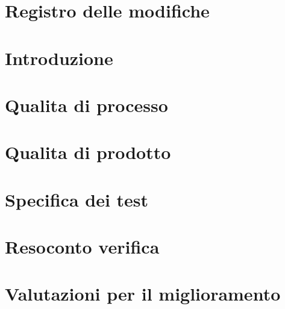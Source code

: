 \documentclass[a4paper, oneside, openany, dvipsnames, table]{article}
\begin{document}
\copertina{}

\section*{Registro delle modifiche}\label{sec:Registro-modifiche}


\newpage
\tableofcontents

\newpage
\listoftables

\newpage
\section{Introduzione}\label{sec:Introduzione}


\newpage
\section{Qualita di processo}\label{sec:Qualita-di-processo}


\newpage
\section{Qualita di prodotto}\label{sec:Qualita-di-prodotto}


\newpage
\section{Specifica dei test}\label{sec:Specifica-dei-test}


\appendix
\newpage
\section{Resoconto verifica}\label{sec:Resoconto-verifica}


\newpage
\section{Valutazioni per il miglioramento}\label{sec:Valutazioni-per-il-miglioramento}

\end{document}

